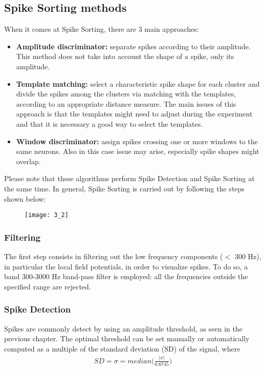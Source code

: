 \subsection{Spike Sorting methods}
When it comes at Spike Sorting, there are 3 main approaches:
\begin{itemize}
    \item \textbf{Amplitude discriminator:} separate spikes according to their amplitude.
    This method does not take into account the shape of a spike, only its
    amplitude.
    \item \textbf{Template matching:} select a characteristic spike shape for each cluster
    and divide the spikes among the clusters via matching with the templates,
    according to an appropriate distance measure. The main issues of this
    approach is that the templates might need to adjust during the experiment
    and that it is necessary a good way to select the templates.
    \item \textbf{Window discriminator:} assign spikes crossing one or more windows
    to the same neurons. Also in this case issue may arise, especially spike
    shapes might overlap.
\end{itemize}
Please note that these algorithms perform Spike Detection and Spike Sorting at the same time. 
In general, Spike Sorting is carried out by following the steps shown below:
\begin{figure}[H]
    \texttt{[image: 3\_2]}
    \centering
\end{figure}
\subsubsection{Filtering}
The first step consists in filtering out the low frequency components
(\(<\) 300 Hz), in particular the local field potentials, in order to visualize
spikes.
To do so, a band 300-3000 Hz band-pass filter is employed: all the
frequencies outside the specified range are rejected.
\subsubsection{Spike Detection}
Spikes are commonly detect by using an amplitude threshold, as seen in the
previous chapter. The optimal threshold can be set manually or automatically
computed as a multiple of the standard deviation (SD) of the signal, where
\begin{align*}
    SD=\sigma=median\biggl(\frac{|x|}{0.6745}\biggr)
\end{align*}
